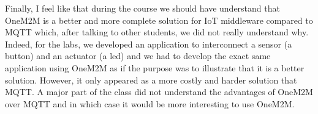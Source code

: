Finally, I feel like that during the course we should have understand that OneM2M is a better and more complete solution for IoT middleware  compared to MQTT which, after talking to other students, we did not really understand why. Indeed, for the labs, we developed an application to interconnect a sensor (a button) and an actuator (a led) and we had to develop the exact same application using OneM2M as if the purpose was to illustrate that it is a better solution. However, it only appeared as a more costly and harder solution that MQTT. A major part of the class did not understand the advantages of OneM2M over MQTT and in which case it would be more interesting to use OneM2M. 